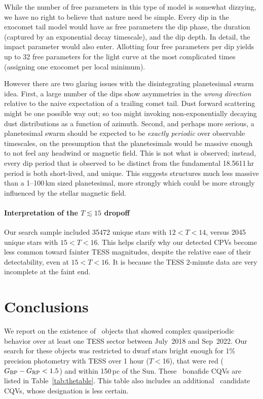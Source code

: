 \documentclass[11pt,twocolumn,tighten]{aastex63}
\newcommand{\bprp}{G_{\rm BP} - G_{\rm RP}}
\begin{document}
While the number of free parameters in this type of model is somewhat
dizzying, we have no right to believe that nature need be
simple.  Every dip in the exocomet tail model would have as free
parameters the dip phase, the duration (captured by an exponential
decay timescale), and the dip depth.  In detail, the impact parameter
would also enter.  Allotting four free parameters per dip yields up to
32 free parameters for the light curve at the most complicated times
(assigning one exocomet per local minimum).

However there are two glaring issues with the disintegrating planetesimal swarm idea.
First, a large number of the dips show asymmetries in the {\it wrong
	direction} relative to the naive expectation of a trailing comet tail.
Dust forward scattering might be one possible way out; so too might
invoking non-exponentially decaying dust
distributions as a function of azimuth.
Second, and perhaps more serious, a planetesimal swarm should be expected
to be {\it exactly periodic} over observable timescales, on the presumption that the planetesimals
would be massive enough to not feel any headwind or magnetic field.
This is not what is observed; instead, every dip period
that is observed to be distinct from the fundamental 18.5611\,hr period
is both short-lived, and unique.
This suggests structures much less massive than a 1--100\,km sized
planetesimal,
 more strongly
which could be more strongly influenced by the stellar magnetic field.


\paragraph{Interpretation of the $T\lesssim 15$ dropoff}
Our search sample included 35472 unique stars with $12<T<14$, versus
2045 unique stars with $15<T<16$.  This helps clarify why our detected
CPVs become less common toward fainter TESS magnitudes, despite the
relative ease of their detectability, even at $15<T<16$.  It is
because the TESS 2-minute data are very incomplete at the faint end.


\section{Conclusions}
\label{sec:conclusion}

We report on the existence of \ngoods\ objects that showed
complex quasiperiodic behavior over at least one TESS sector between July~2018 and Sep~2022.
Our search for these objects was restricted to dwarf stars bright enough
for 1\% precision photometry with TESS over 1 hour ($T$$<$16),
that were red ($\bprp<1.5$) and within 150\,pc of the Sun.
These \ngoods\ bonafide CQVs are listed in Table~\ref{tab:thetable}.
This table also includes an additional \nmaybes\ candidate CQVs, whose
designation is less certain.
\end{document}
